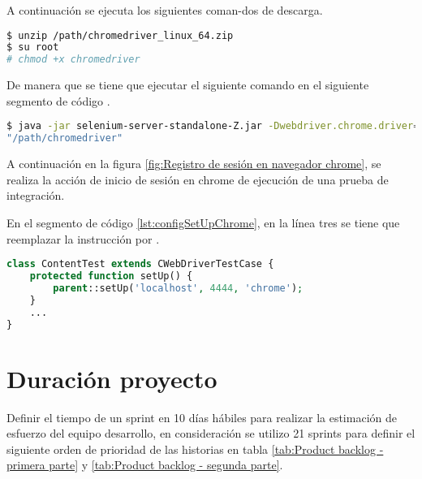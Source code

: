 \begin{itemize}
\begin{enumerate}
A continuación se ejecuta los siguientes coman-dos de descarga.

\begin{lstlisting}[language=bash, caption={Instalación de programa de control para chrome.}]
$ unzip /path/chromedriver_linux_64.zip
$ su root
# chmod +x chromedriver
\end{lstlisting}

De manera que se tiene que ejecutar el siguiente comando en el siguiente
segmento de código .

\begin{lstlisting}[language=bash, caption={Configuración chromedriver en selenium server.}]
$ java -jar selenium-server-standalone-Z.jar -Dwebdriver.chrome.driver=
"/path/chromedriver"
\end{lstlisting}

A continuación en la figura \ref{fig:Registro de sesión en navegador chrome},
se realiza la acción de inicio de sesión en chrome de ejecución de una prueba
de integración.

\begin{minipage}{1.0\textwidth}
	\centering
	\label{fig:Registro de sesión en navegador chrome}
\end{minipage}

En el segmento de código \ref{lst:configSetUpChrome}, en la línea tres se
tiene que reemplazar la instrucción  por .

\begin{lstlisting}[language=PHP, caption={Configuración de ejecución de prueba para chrome.}, label={lst:configSetUpChrome}]
class ContentTest extends CWebDriverTestCase {
	protected function setUp() {
        parent::setUp('localhost', 4444, 'chrome');
    }
    ...
}
\end{lstlisting}

\end{enumerate}

\end{itemize}

\section{Duración proyecto}

Definir el tiempo de un sprint en 10 días hábiles para realizar la estimación
de esfuerzo del equipo desarrollo, en consideración se utilizo 21 sprints
para definir el siguiente orden de prioridad de las historias en tabla
\ref{tab:Product backlog - primera parte} y 
\ref{tab:Product backlog - segunda parte}.

